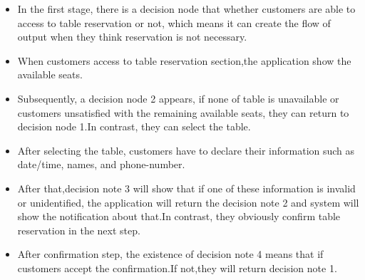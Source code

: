 \documentclass[11pt]{article}
\begin{document}
            \begin{itemize}
                \item In the first stage, there is a decision node that whether customers are able to access to table reservation or not, which means it can create the flow of output when they think reservation is not necessary.
                \item When customers access to table reservation section,the application show the available seats.
                \item Subsequently, a decision node 2 appears, if none of table is unavailable or  customers unsatisfied with the remaining available seats, they can return to decision node 1.In contrast, they can select the table.
                \item After selecting the table, customers have to declare their information such as date/time, names, and phone-number.
                \item After that,decision note 3 will show that if one of these information is invalid or unidentified, the application will return the decision note 2 and system will show the notification about that.In contrast, they obviously
                confirm table reservation in the next step.
                \item After confirmation step, the existence of decision note 4 means that if customers accept the confirmation.If not,they will return decision note 1.
            \end{itemize}
            
\end{document}
